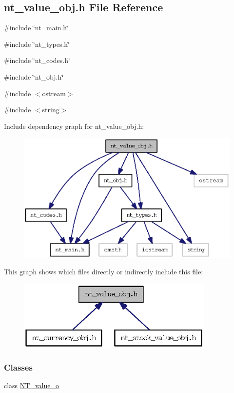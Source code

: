 \subsection{nt\_\-value\_\-obj.h File Reference}
\label{nt__value__obj_8h}
{\ttfamily \#include \char`\"{}nt\_\-main.h\char`\"{}}\par
{\ttfamily \#include \char`\"{}nt\_\-types.h\char`\"{}}\par
{\ttfamily \#include \char`\"{}nt\_\-codes.h\char`\"{}}\par
{\ttfamily \#include \char`\"{}nt\_\-obj.h\char`\"{}}\par
{\ttfamily \#include $<$ostream$>$}\par
{\ttfamily \#include $<$string$>$}\par
Include dependency graph for nt\_\-value\_\-obj.h:
\nopagebreak
\begin{figure}[H]
\begin{center}
\leavevmode
\includegraphics[width=384pt]{nt__value__obj_8h__incl}
\end{center}
\end{figure}
This graph shows which files directly or indirectly include this file:
\nopagebreak
\begin{figure}[H]
\begin{center}
\leavevmode
\includegraphics[width=278pt]{nt__value__obj_8h__dep__incl}
\end{center}
\end{figure}
\subsubsection*{Classes}
\begin{DoxyCompactItemize}
\item 
class \hyperlink{class_n_t__value__o}{NT\_\-value\_\-o}
\end{DoxyCompactItemize}
